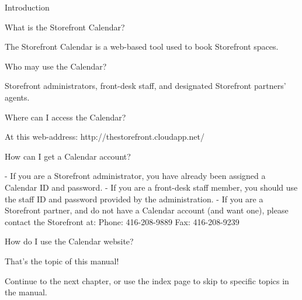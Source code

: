 Introduction


What is the Storefront Calendar?

The Storefront Calendar is a web-based tool used to book Storefront spaces.


Who may use the Calendar?

Storefront administrators, front-desk staff, and designated Storefront partners' agents.


Where can I access the Calendar?

At this web-address: http://thestorefront.cloudapp.net/


How can I get a Calendar account?

- If you are a Storefront administrator, you have already been assigned a Calendar ID and password.
- If you are a front-desk staff member, you should use the staff ID and password provided by the administration.
- If you are a Storefront partner, and do not have a Calendar account (and want one), please contact the Storefront at:
     Phone: 416-208-9889
     Fax: 416-208-9239 


How do I use the Calendar website?

That's the topic of this manual!

Continue to the next chapter, or use the index page to skip to specific topics in the manual.








